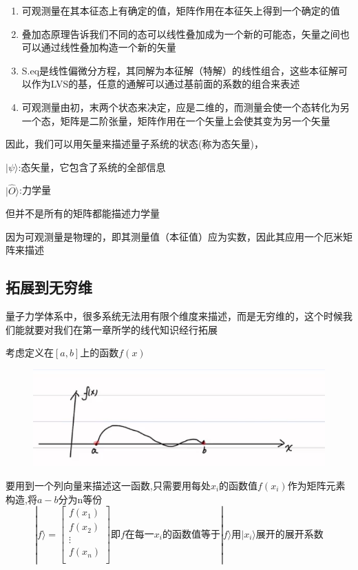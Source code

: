 \documentclass[lang=cn,15pt]{elegantbook}
\begin{document}
\begin{enumerate}
	\item 可观测量在其本征态上有确定的值，矩阵作用在本征矢上得到一个确定的值
	\item 叠加态原理告诉我们不同的态可以线性叠加成为一个新的可能态，矢量之间也可以通过线性叠加构造一个新的矢量
	\item S.eq是线性偏微分方程，其同解为本征解（特解）的线性组合，这些本征解可以作为LVS的基，任意的通解可以通过基前面的系数的组合来表述
	\item 可观测量由初，末两个状态来决定，应是二维的，而测量会使一个态转化为另一个态，矩阵是二阶张量，矩阵作用在一个矢量上会使其变为另一个矢量
\end{enumerate}
因此，我们可以用矢量来描述量子系统的状态(称为态矢量)，

$|\psi \rangle $:态矢量，它包含了系统的全部信息

$|\hat{O} \rangle $:力学量

但并不是所有的矩阵都能描述力学量

因为可观测量是物理的，即其测量值（本征值）应为实数，因此其应用一个厄米矩阵来描述
\subsection{拓展到无穷维}

量子力学体系中，很多系统无法用有限个维度来描述，而是无穷维的，这个时候我们能就要对我们在第一章所学的线代知识经行拓展

考虑定义在$[a,b]$上的函数$f(x)$
\begin{figure}[H]
	\centering
	\includegraphics[width=0.7\linewidth]{figure/screenshot0017}
\end{figure}


要用到一个列向量来描述这一函数,只需要用每处$x_i$的函数值$f(x_i)$作为矩阵元素构造,将$a-b$分为n等份
\begin{equation*}
	|f\rangle =\left[ \begin{array}{c}
		f\left( x_1 \right)\\
		f\left( x_2 \right)\\
		\vdots\\
		f\left( x_n \right)\\
	\end{array} \right] \text{即}f\text{在每一}x_i\text{的函数值等于}|f\rangle \text{用}|x_i\rangle \text{展开的展开系数}
\end{equation*}
\end{document}
